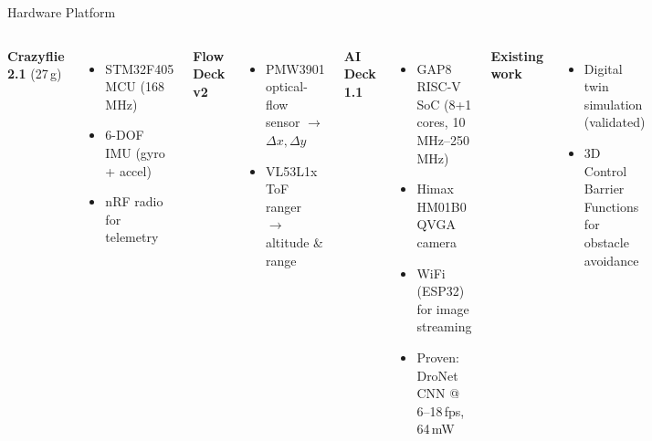 \documentclass[aspectratio=169, 10pt]{beamer}
\begin{document}
\begin{frame}{Hardware Platform}
\begin{columns}[T]
\textbf{Crazyflie 2.1} (27\,g)
\begin{itemize}
  \item STM32F405 MCU (168\,MHz)
  \item 6-DOF IMU (gyro + accel)
  \item nRF radio for telemetry
\end{itemize}

\vspace{0.5em}
\textbf{Flow Deck v2}
\begin{itemize}
  \item PMW3901 optical-flow sensor $\rightarrow$ $\Delta x, \Delta y$
  \item VL53L1x ToF ranger $\rightarrow$ altitude \& range
\end{itemize}

\textbf{AI Deck 1.1}
\begin{itemize}
  \item GAP8 RISC-V SoC (8+1 cores, 10\,MHz--250\,MHz)
  \item Himax HM01B0 QVGA camera
  \item WiFi (ESP32) for image streaming
  \item Proven: DroNet CNN @ 6--18\,fps, 64\,mW
\end{itemize}

\vspace{0.5em}
\textbf{Existing work}
\begin{itemize}
  \item Digital twin simulation (validated)
  \item 3D Control Barrier Functions for obstacle avoidance
\end{itemize}
\end{columns}
\end{frame}
\end{document}
